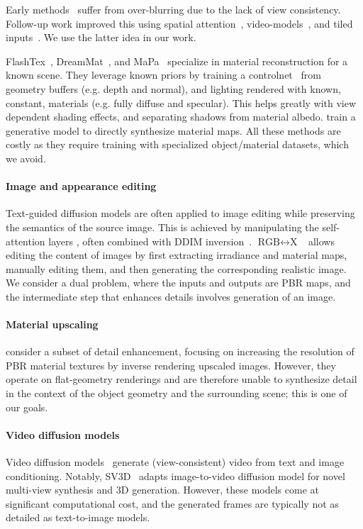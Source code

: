 Early methods~\cite{richardson2023texture,chen2023text2tex,cao2023textfusion} suffer from over-blurring due to the lack of view consistency. 
Follow-up work improved this using spatial attention~\cite{shi2023MVDream}, video-models~\cite{voleti2024sv3d, wu2024cat4d}, and tiled inputs~\cite{flashtex}.
We use the latter idea in our work.

FlashTex~\cite{flashtex}, DreamMat~\cite{dreammat}, and MaPa~\cite{mapa} specialize in material reconstruction for a 
known scene. They leverage known priors by training a controlnet~\cite{controlnet} from geometry buffers 
(e.g. depth and normal), and lighting rendered with known, constant, materials (e.g. fully diffuse and specular). 
This helps greatly with view dependent shading effects, and separating shadows from material albedo. 
\citet{Vecchio2024controlmat} train a generative model to directly synthesize material maps.
All these methods are costly as they require training with specialized object/material datasets, which we avoid.






\paragraph{Image and appearance editing}
Text-guided diffusion models are often applied to image editing while preserving the semantics of the source image.
This is achieved by manipulating the self-attention layers 
\cite{tumanyan2023pnp}, often combined with DDIM inversion~\cite{mokady2023nulltext,parmar2023pix2pixzero}.
$\text{RGB}{\leftrightarrow}\text{X}$~\cite{RGBX} allows editing the content of images by first extracting irradiance and material maps, manually editing them, and then generating the corresponding realistic image.
We consider a dual problem, where the inputs and outputs are PBR maps, and the intermediate step that enhances details involves generation of an image.




\paragraph{Material upscaling}
\citet{gauthier2024matup} consider a subset of detail enhancement, focusing on increasing the resolution of PBR material textures by inverse rendering upscaled images.
However, they operate on flat-geometry renderings and are therefore unable to synthesize detail in the context of the object geometry and the surrounding scene; this is one of our goals.


\paragraph{Video diffusion models}
Video diffusion models~\cite{blattmann2023svd,hong2023cogvideo,yang2024cogvideox} generate (view-consistent) video from text and image conditioning. Notably, SV3D~\cite{voleti2024sv3d} adapts image-to-video diffusion model for novel multi-view synthesis and 3D generation. However, these models come at significant computational cost, and the generated frames are typically not as detailed as text-to-image models.